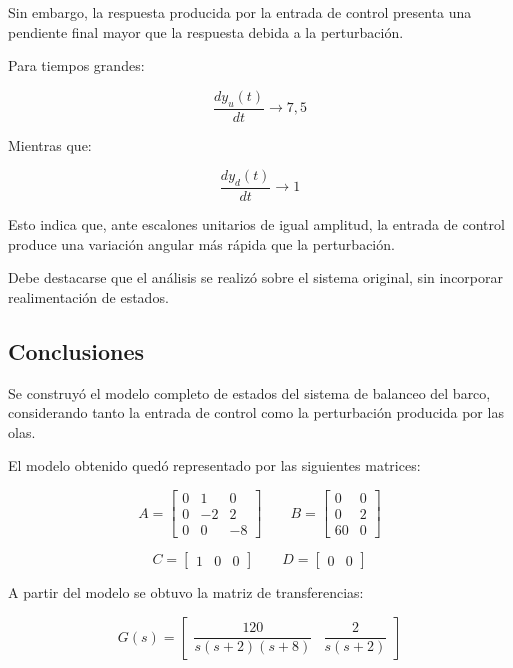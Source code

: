 \documentclass[12pt,a4paper]{article}
\begin{document}
Sin embargo, la respuesta producida por la entrada de control presenta una pendiente final mayor que la respuesta debida a la perturbación.

Para tiempos grandes:

\begin{equation}\frac{dy_u(t)}{dt}\longrightarrow 7{,}5\end{equation}

Mientras que:

\begin{equation}\frac{dy_d(t)}{dt}\longrightarrow 1\end{equation}

Esto indica que, ante escalones unitarios de igual amplitud, la entrada de control produce una variación angular más rápida que la perturbación.

Debe destacarse que el análisis se realizó sobre el sistema original, sin incorporar realimentación de estados.
\subsection*{Conclusiones}
Se construyó el modelo completo de estados del sistema de balanceo del barco, considerando tanto la entrada de control como la perturbación producida por las olas.

El modelo obtenido quedó representado por las siguientes matrices:

\begin{equation}\boxed{A=\begin{bmatrix}0&1&0\\0&-2&2\\0&0&-8\end{bmatrix} \qquad B=\begin{bmatrix}0&0\\0&2\\60&0\end{bmatrix}}\end{equation}

\begin{equation}\boxed{C=\begin{bmatrix}1&0&0\end{bmatrix} \qquad D=\begin{bmatrix}0&0\end{bmatrix}}\end{equation}

A partir del modelo se obtuvo la matriz de transferencias:

\begin{equation}\boxed{G(s)=\begin{bmatrix}\dfrac{120}{s(s+2)(s+8)}&\dfrac{2}{s(s+2)}\end{bmatrix}}\end{equation}
\end{document}
